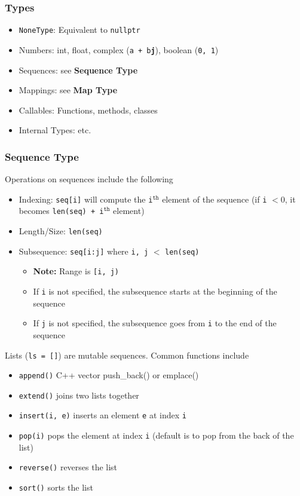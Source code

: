 \documentclass[13pt]{article}
\begin{document}
      \subsubsection{Types}
      \begin{itemize}[leftmargin = 0pt]
      \item [] \texttt{NoneType}: Equivalent to \texttt{nullptr}
      \item [] Numbers: int, float, complex (\texttt{a + b\textbf{j}}), boolean (\texttt{0, 1})
      \item [] Sequences: see \textbf{Sequence Type}
      \item [] Mappings: see \textbf{Map Type}
      \item [] Callables: Functions, methods, classes
      \item [] Internal Types: etc.
      \end{itemize}

      \subsubsection{Sequence Type}
      Operations on sequences include the following
      \begin{itemize}[leftmargin = 0pt]
      \item [] Indexing: \texttt{seq[i]} will compute the \texttt{i}$^{\texttt{th}}$ element of the sequence (if \texttt{i} $< 0$, it becomes \texttt{len(seq) + i}$^{\texttt{th}}$ element)
      \item [] Length/Size: \texttt{len(seq)}
      \item [] Subsequence: \texttt{seq[i:j]} where \texttt{i, j} $<$ \texttt{len(seq)}
        \begin{itemize}[leftmargin = 0pt]
        \item [] \textbf{Note:} Range is \texttt{[i, j)}
        \item [] If \texttt{i} is not specified, the subsequence starts at the beginning of the sequence
        \item [] If \texttt{j} is not specified, the subsequence goes from \texttt{i} to the end of the sequence
        \end{itemize}
      \end{itemize}
      Lists (\texttt{ls = []}) are mutable sequences. Common functions include
      \begin{itemize}[leftmargin = 0pt]
      \item [] \texttt{append()} C++ vector push\_back() or emplace()
      \item [] \texttt{extend()} joins two lists together
      \item [] \texttt{insert(i, e)} inserts an element \texttt{e} at index \texttt{i}
      \item [] \texttt{pop(i)} pops the element at index \texttt{i} (default is to pop from the back of the list)
      \item [] \texttt{reverse()} reverses the list
      \item [] \texttt{sort()} sorts the list
      \end{itemize}
\end{document}
